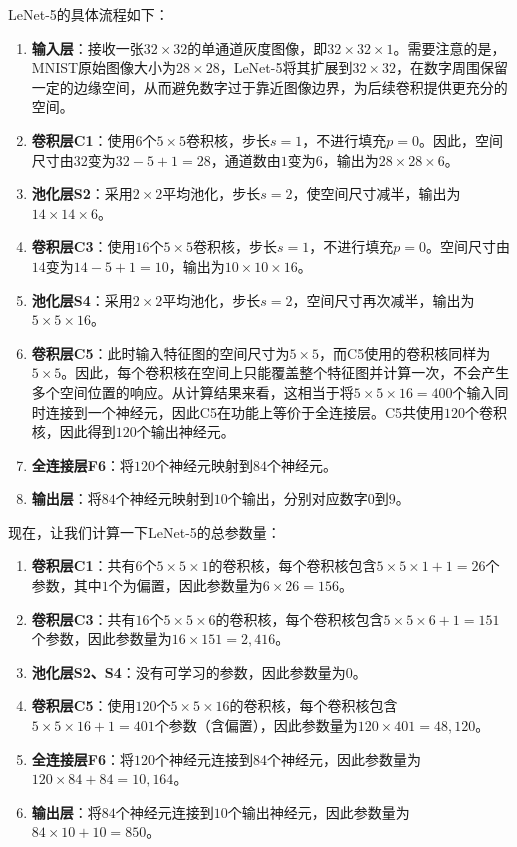 LeNet-5的具体流程如下：
\begin{enumerate}
    \item \textbf{输入层}：接收一张$32\times32$的单通道灰度图像，即$32\times32\times1$。需要注意的是，MNIST原始图像大小为$28\times28$，LeNet-5将其扩展到$32\times32$，在数字周围保留一定的边缘空间，从而避免数字过于靠近图像边界，为后续卷积提供更充分的空间。
    \item \textbf{卷积层C1}：使用$6$个$5\times5$卷积核，步长$s=1$，不进行填充$p=0$。因此，空间尺寸由$32$变为$32-5+1=28$，通道数由$1$变为$6$，输出为$28\times28\times6$。
    \item \textbf{池化层S2}：采用$2\times2$平均池化，步长$s=2$，使空间尺寸减半，输出为$14\times14\times6$。
    \item \textbf{卷积层C3}：使用$16$个$5\times5$卷积核，步长$s=1$，不进行填充$p=0$。空间尺寸由$14$变为$14-5+1=10$，输出为$10\times10\times16$。
    \item \textbf{池化层S4}：采用$2\times2$平均池化，步长$s=2$，空间尺寸再次减半，输出为$5\times5\times16$。
    \item \textbf{卷积层C5}：此时输入特征图的空间尺寸为$5\times5$，而C5使用的卷积核同样为$5\times5$。因此，每个卷积核在空间上只能覆盖整个特征图并计算一次，不会产生多个空间位置的响应。从计算结果来看，这相当于将$5\times5\times16=400$个输入同时连接到一个神经元，因此C5在功能上等价于全连接层。C5共使用$120$个卷积核，因此得到$120$个输出神经元。
    \item \textbf{全连接层F6}：将$120$个神经元映射到$84$个神经元。
    \item \textbf{输出层}：将$84$个神经元映射到$10$个输出，分别对应数字$0$到$9$。
\end{enumerate}

现在，让我们计算一下LeNet-5的总参数量：

\begin{enumerate}
    \item \textbf{卷积层C1}：共有$6$个$5\times5\times1$的卷积核，每个卷积核包含$5\times5\times1+1=26$个参数，其中$1$个为偏置，因此参数量为$6\times26=156$。
    \item \textbf{卷积层C3}：共有$16$个$5\times5\times6$的卷积核，每个卷积核包含$5\times5\times6+1=151$个参数，因此参数量为$16\times151=2,416$。
    \item \textbf{池化层S2、S4}：没有可学习的参数，因此参数量为$0$。
    \item \textbf{卷积层C5}：使用$120$个$5\times5\times16$的卷积核，每个卷积核包含$5\times5\times16+1=401$个参数（含偏置），因此参数量为$120\times401=48,120$。
    \item \textbf{全连接层F6}：将$120$个神经元连接到$84$个神经元，因此参数量为$120\times84+84=10,164$。
    \item \textbf{输出层}：将$84$个神经元连接到$10$个输出神经元，因此参数量为$84\times10+10=850$。
\end{enumerate}

